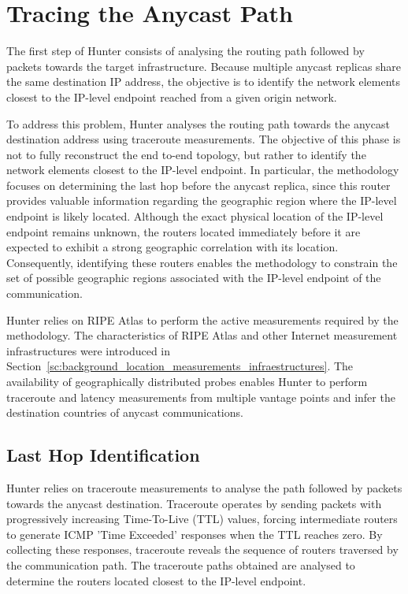 \section{Tracing the Anycast Path}
\label{sc:hunter_tracing_anycast_path}

The first step of Hunter consists of analysing the routing path followed by packets towards the target infrastructure. Because multiple anycast replicas share the same destination IP address, the objective is to identify the network elements closest to the IP-level endpoint reached from a given origin network.

To address this problem, Hunter analyses the routing path towards the anycast destination address using traceroute measurements. The objective of this phase is not to fully reconstruct the end to-end topology, but rather to identify the network elements closest to the IP-level endpoint. In particular, the methodology focuses on determining the last hop before the anycast replica, since this router provides valuable information regarding the geographic region where the IP-level endpoint is likely located. Although the exact physical location of the IP-level endpoint remains unknown, the routers located immediately before it are expected to exhibit a strong geographic correlation with its location. Consequently, identifying these routers enables the methodology to constrain the set of possible geographic regions associated with the IP-level endpoint of the communication.

Hunter relies on RIPE Atlas to perform the active measurements required by the methodology. The characteristics of RIPE Atlas and other Internet measurement infrastructures were introduced in Section~\ref{sc:background_location_measurements_infraestructures}. The availability of geographically distributed probes enables Hunter to perform traceroute and latency measurements from multiple vantage points and infer the destination countries of anycast communications.

\subsection{Last Hop Identification}
\label{sc:hunter_tracing_anycast_path_last_hop_identification}

Hunter relies on traceroute measurements to analyse the path followed by packets towards the anycast destination. Traceroute operates by sending packets with progressively increasing Time-To-Live (TTL) values, forcing intermediate routers to generate ICMP 'Time Exceeded' responses when the TTL reaches zero. By collecting these responses, traceroute reveals the sequence of routers traversed by the communication path. The traceroute paths obtained are analysed to determine the routers located closest to the IP-level endpoint.

